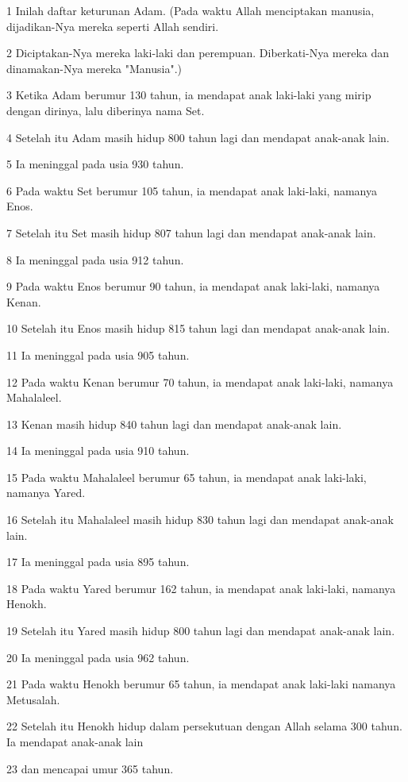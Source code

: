 \par 1 Inilah daftar keturunan Adam. (Pada waktu Allah menciptakan manusia, dijadikan-Nya mereka seperti Allah sendiri.
\par 2 Diciptakan-Nya mereka laki-laki dan perempuan. Diberkati-Nya mereka dan dinamakan-Nya mereka "Manusia".)
\par 3 Ketika Adam berumur 130 tahun, ia mendapat anak laki-laki yang mirip dengan dirinya, lalu diberinya nama Set.
\par 4 Setelah itu Adam masih hidup 800 tahun lagi dan mendapat anak-anak lain.
\par 5 Ia meninggal pada usia 930 tahun.
\par 6 Pada waktu Set berumur 105 tahun, ia mendapat anak laki-laki, namanya Enos.
\par 7 Setelah itu Set masih hidup 807 tahun lagi dan mendapat anak-anak lain.
\par 8 Ia meninggal pada usia 912 tahun.
\par 9 Pada waktu Enos berumur 90 tahun, ia mendapat anak laki-laki, namanya Kenan.
\par 10 Setelah itu Enos masih hidup 815 tahun lagi dan mendapat anak-anak lain.
\par 11 Ia meninggal pada usia 905 tahun.
\par 12 Pada waktu Kenan berumur 70 tahun, ia mendapat anak laki-laki, namanya Mahalaleel.
\par 13 Kenan masih hidup 840 tahun lagi dan mendapat anak-anak lain.
\par 14 Ia meninggal pada usia 910 tahun.
\par 15 Pada waktu Mahalaleel berumur 65 tahun, ia mendapat anak laki-laki, namanya Yared.
\par 16 Setelah itu Mahalaleel masih hidup 830 tahun lagi dan mendapat anak-anak lain.
\par 17 Ia meninggal pada usia 895 tahun.
\par 18 Pada waktu Yared berumur 162 tahun, ia mendapat anak laki-laki, namanya Henokh.
\par 19 Setelah itu Yared masih hidup 800 tahun lagi dan mendapat anak-anak lain.
\par 20 Ia meninggal pada usia 962 tahun.
\par 21 Pada waktu Henokh berumur 65 tahun, ia mendapat anak laki-laki namanya Metusalah.
\par 22 Setelah itu Henokh hidup dalam persekutuan dengan Allah selama 300 tahun. Ia mendapat anak-anak lain
\par 23 dan mencapai umur 365 tahun.
